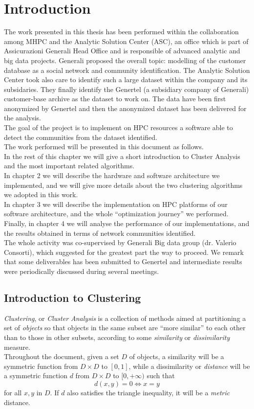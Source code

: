 \documentclass[a4paper,11pt]{book}
\begin{document}
\chapter{Introduction}
The work presented in this thesis  has been performed within the collaboration among MHPC and the Analytic Solution Center (ASC), an office which is part of Assicurazioni Generali Head Office and is responsible of advanced analytic and big data projects. Generali proposed the overall topic: modelling of the customer database as a social network and community identification.  The Analytic Solution Center took also care to identify  such a large dataset within the company and its subsidaries. They finally identify the  Genertel (a subsidiary company of Generali) customer-base archive as the dataset to work on. The data have been first anonymized by Genertel and then the anonymized dataset has been delivered for the analysis.\\
The goal of the project is to implement on HPC resources a software able to detect the communities from the dataset identified.\\

The work performed will be presented in this document as follows.\\
In the rest of this chapter we will give a short introduction to Cluster Analysis and the most important related algorithms.\\
In chapter 2 we will describe the hardware and software architecture we implemented, and we will give more details about the two clustering algorithms we adopted in this work.\\
In chapter 3 we will describe the implementation on HPC platforms of our software architecture, and the whole ``optimization journey'' we performed.\\
Finally, in chapter 4 we will analyse the performance of our implementations, and the results obtained in terms of network communities identified.\\

The whole activity was co-supervised by Generali Big data group (dr. Valerio Consorti), which suggested for the greatest part the way to proceed. We remark that some deliverables has been submitted to Genertel and intermediate results were periodically discussed during several meetings.
\section{Introduction to Clustering}
\textit{Clustering}, or \textit{Cluster Analysis} is a collection of methods aimed at partitioning a set of \textit{objects} so that objects in the same subset are ``more similar'' to each other than to those in other subsets, according to some \textit{similarity} or \textit{dissimilarity} measure.\\
Throughout the document, given a set $D$ of objects, a similarity will be a symmetric function from $D\times D$ to $[0,1]$, while a dissimilarity or \textit{distance} will be a symmetric function $d$ from $D\times D$ to $[0,+\infty)$ such that
$$
d(x,y) = 0\Leftrightarrow x = y
$$
for all $x,y$ in $D$. If $d$ also satisfies the triangle inequality, it will be a \textit{metric} distance.\\
\end{document}
